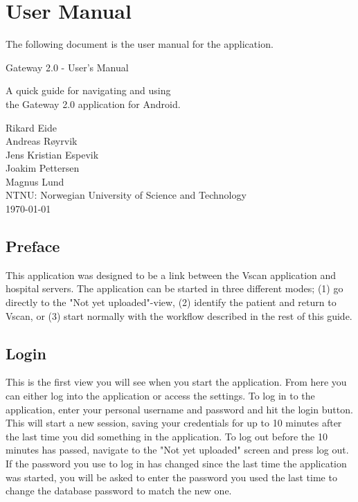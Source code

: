 \section{User Manual}
\label{usermanual}
The following document is the user manual for the application.


\newpage
\begin{center}
    \vspace*{1cm}
    
    \huge{Gateway 2.0 - User's Manual}
    
    \vspace{2cm}
    \normalsize
    A quick guide for navigating and using \\the Gateway 2.0 application for Android.
    
    
    \vfill
    
    
    \normalsize
    {Rikard Eide\\Andreas Røyrvik\\Jens Kristian Espevik\\Joakim Pettersen\\Magnus Lund\\}
    \vspace{0.8cm}
    NTNU: Norwegian University of Science and Technology\\
    \vspace{0.8cm}
    \today
    \vspace{0.8cm}
    
\end{center}
\newpage

\subsection*{Preface}
This application was designed to be a link between the Vscan application and hospital servers. The application can be started in three different modes; (1) go directly to the "Not yet uploaded"-view, (2) identify the patient and return to Vscan, or (3) start normally with the workflow described in the rest of this guide.

\newpage
\subsection*{Login}
This is the first view you will see when you start the application. From here you can either log into the application or access the settings. To log in to the application, enter your personal username and password and hit the login button. This will start a new session, saving your credentials for up to 10 minutes after the last time you did something in the application. To log out before the 10 minutes has passed, navigate to the "Not yet uploaded" screen and press log out.
If the password you use to log in has changed since the last time the application was started, you will be asked to enter the password you used the last time to change the database password to match the new one.


